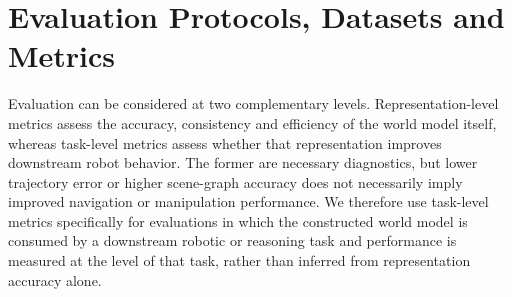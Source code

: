 \section{Evaluation Protocols, Datasets and Metrics}\label{sec:evaluation_metrics}
Evaluation can be considered at two complementary levels. 
Representation-level metrics assess the accuracy, consistency and efficiency of the world model itself, whereas task-level metrics assess whether that representation improves downstream robot behavior.
The former are necessary diagnostics, but lower trajectory error or higher scene-graph accuracy does not necessarily imply improved navigation or manipulation performance.
We therefore use task-level metrics specifically for evaluations in which the constructed world model is consumed by a downstream robotic or reasoning task and performance is measured at the level of that task, rather than inferred from representation accuracy alone.

